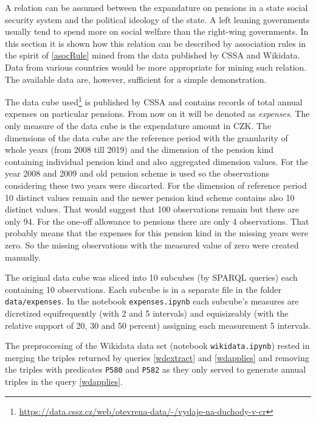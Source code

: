 A relation can be assumed between the expandature on pensions in a state social security system and the political ideology of the state. A left leaning governments usually tend to spend more on social welfare than the right-wing governments. In this section it is shown how this relation can be described by association rules in the spirit of \ref{asocRule} mined from the data published by CSSA and Wikidata. Data from various countries would be more appropriate for mining such relation. The available data are, however, sufficient for a simple demonstration. 

The data cube used\footnote{\href{https://data.cssz.cz/web/otevrena-data/-/vydaje-na-duchody-v-cr}{https://data.cssz.cz/web/otevrena-data/-/vydaje-na-duchody-v-cr}} is published by CSSA and contains records of total annual expenses on particular pensions. From now on it will be denoted as \textit{expenses}. The only measure of the data cube is the expendature amount in CZK. The dimensions of the data cube are the reference period with the granularity of whole years (from 2008 till 2019) and the dimension of the pension kind containing individual pension kind and also aggregated dimension values. For the year 2008 and 2009 and old pension scheme is used so the observations considering these two years were discarted. For the dimension of reference period 10 distinct values remain and the newer pension kind scheme contains also 10 distinct values. That would suggest that 100 observations remain but there are only 94. For the one-off allowance to pensions there are only 4 observations. That probably means that the expenses for this pension kind in the missing years were zero. So the missing observations with the measured value of zero were created manually.

The original data cube was sliced into 10 subcubes (by SPARQL queries) each containing 10 observations. Each subcube is in a separate file in the folder \verb|data/expenses|. In the notebook \verb|expenses.ipynb| each subcube's measures are dicretized equifrequently (with 2 and 5 intervals) and equisizeably (with the relative support of 20, 30 and 50 percent) assigning each measurement 5 intervals.

The preproccesing of the Wikidata data set (notebook \verb|wikidata.ipynb|) rested in merging the triples returned by queries \ref{wdextract} and \ref{wdapplies} and removing the triples with predicates \verb|P580| and \verb|P582| as they only served to generate annual triples in the query \ref{wdapplies}.

